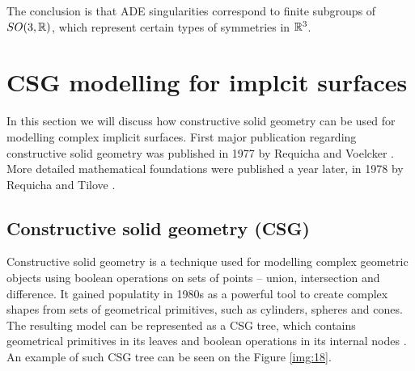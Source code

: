 The conclusion is that ADE singularities correspond to finite subgroups of
$SO(3, \mathbb{R})$, which represent certain types of symmetries in $\mathbb{R}^3$.

\section{CSG modelling for implcit surfaces}
\label{sub2.6}
In this section we will discuss how constructive solid geometry can be used for
modelling complex implicit surfaces. First major publication regarding constructive
solid geometry was published in 1977 by Requicha and Voelcker \cite{requicha1977constructive}.
More detailed mathematical foundations were published a year later, in 1978 by
Requicha and Tilove \cite{requicha1978mathematical}.
\subsection*{Constructive solid geometry (CSG)}
Constructive solid geometry is a technique used for modelling complex geometric
objects using boolean operations on sets of points -- union, intersection and
difference. It gained populatity in 1980s as a powerful tool to create complex
shapes from sets of geometrical primitives, such as cylinders, spheres and cones.
The resulting model can be represented as a CSG tree, which contains geometrical
primitives in its leaves and boolean operations in its internal nodes 
\cite{foley1996computer}. An example of such CSG tree can be seen on the Figure 
\ref{img:18}.


